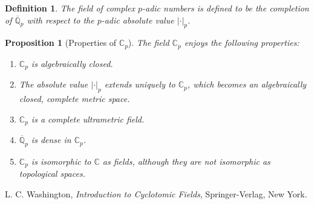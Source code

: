 \documentclass[12pt]{article}
\newtheorem*{defn}{Definition}
\newtheorem*{prop}{Proposition}
\theoremstyle{definition}
\newcommand{\Complex}{\mathbb{C}}
\newcommand{\Rats}{\mathbb{Q}}
\begin{document}
\begin{defn}
The field of complex $p$-adic numbers is defined to be the completion of $\overline{\Rats}_p$ with respect to the $p$-adic absolute value $|\cdot|_p$.
\end{defn}

\begin{prop}[Properties of $\Complex_p$]
The field $\Complex_p$ enjoys the following properties:
\begin{enumerate}
\item $\Complex_p$ is algebraically closed.
\item The absolute value $|\cdot|_p$ extends uniquely to $\Complex_p$, which becomes an algebraically closed, complete metric space.
\item $\Complex_p$ is a complete ultrametric field.
\item $\overline{\Rats}_p$ is dense in $\Complex_p$.
\item $\Complex_p$ is isomorphic to $\Complex$ as fields, although they are not isomorphic as topological spaces.
\end{enumerate}
\end{prop}

\begin{thebibliography}{9}
 L. C. Washington, {\em Introduction to Cyclotomic Fields},
Springer-Verlag, New York.
\end{thebibliography}
\end{document}

